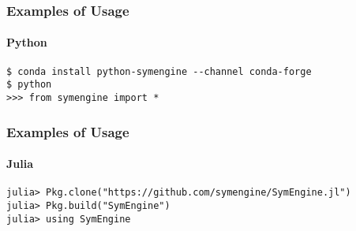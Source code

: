 \documentclass{beamer}
\begin{document}
\begin{frame}[fragile]
\frametitle{Examples of Usage}
\framesubtitle{Python}

\begin{verbatim}
$ conda install python-symengine --channel conda-forge
$ python
>>> from symengine import *
\end{verbatim}
\end{frame}


\begin{frame}[fragile]
\frametitle{Examples of Usage}
\framesubtitle{Julia}

\begin{verbatim}
julia> Pkg.clone("https://github.com/symengine/SymEngine.jl")
julia> Pkg.build("SymEngine")
julia> using SymEngine
\end{verbatim}
\end{frame}
\end{document}
